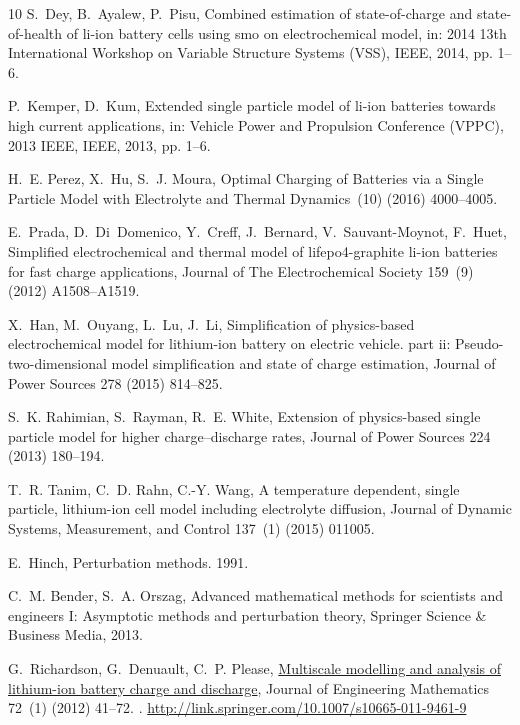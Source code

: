 \documentclass[a4paper]{article}
\begin{document}
\begin{thebibliography}{10}
    S.~Dey, B.~Ayalew, P.~Pisu, Combined estimation of state-of-charge and
      state-of-health of li-ion battery cells using smo on electrochemical model,
      in: 2014 13th International Workshop on Variable Structure Systems (VSS),
      IEEE, 2014, pp. 1--6.
    
    P.~Kemper, D.~Kum, Extended single particle model of li-ion batteries towards
      high current applications, in: Vehicle Power and Propulsion Conference
      (VPPC), 2013 IEEE, IEEE, 2013, pp. 1--6.
    
    H.~E. Perez, X.~Hu, S.~J. Moura, {Optimal Charging of Batteries via a Single
      Particle Model with Electrolyte and Thermal Dynamics}~(10) (2016) 4000--4005.
    
    E.~Prada, D.~Di~Domenico, Y.~Creff, J.~Bernard, V.~Sauvant-Moynot, F.~Huet,
      Simplified electrochemical and thermal model of lifepo4-graphite li-ion
      batteries for fast charge applications, Journal of The Electrochemical
      Society 159~(9) (2012) A1508--A1519.
    
    X.~Han, M.~Ouyang, L.~Lu, J.~Li, Simplification of physics-based
      electrochemical model for lithium-ion battery on electric vehicle. part ii:
      Pseudo-two-dimensional model simplification and state of charge estimation,
      Journal of Power Sources 278 (2015) 814--825.
    
    S.~K. Rahimian, S.~Rayman, R.~E. White, Extension of physics-based single
      particle model for higher charge--discharge rates, Journal of Power Sources
      224 (2013) 180--194.
    
    T.~R. Tanim, C.~D. Rahn, C.-Y. Wang, A temperature dependent, single particle,
      lithium-ion cell model including electrolyte diffusion, Journal of Dynamic
      Systems, Measurement, and Control 137~(1) (2015) 011005.
    
    E.~Hinch, Perturbation methods. 1991.
    
    C.~M. Bender, S.~A. Orszag, Advanced mathematical methods for scientists and
      engineers I: Asymptotic methods and perturbation theory, Springer Science \&
      Business Media, 2013.
    
    G.~Richardson, G.~Denuault, C.~P. Please,
      \href{http://link.springer.com/10.1007/s10665-011-9461-9}{{Multiscale
      modelling and analysis of lithium-ion battery charge and discharge}}, Journal
      of Engineering Mathematics 72~(1) (2012) 41--72.
    \newblock \href {https://doi.org/10.1007/s10665-011-9461-9}
      {}.
    \newline\urlprefix\url{http://link.springer.com/10.1007/s10665-011-9461-9}
    

\end{thebibliography}
\end{document}
